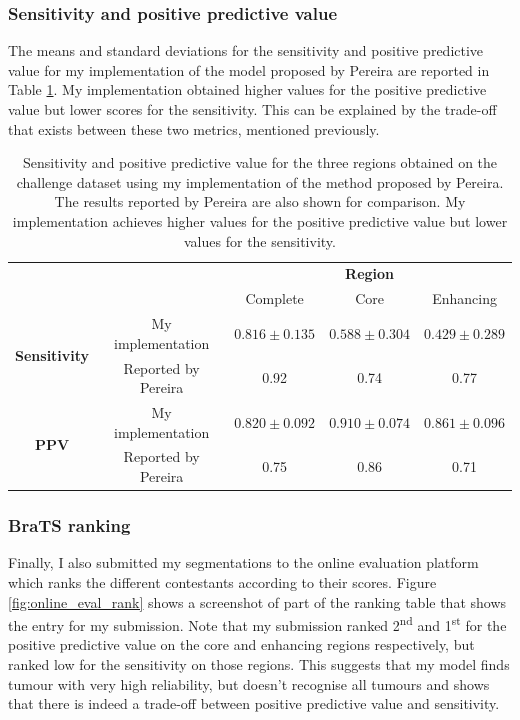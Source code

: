 \documentclass[12pt,a4paper,twoside,openright]{report}
\begin{document}
\subsubsection{Sensitivity and positive predictive value}
The means and standard deviations for the sensitivity and positive predictive value for my implementation of the model proposed by Pereira are reported in Table \ref{table:pereira_sensitivity_average}. My implementation obtained higher values for the positive predictive value but lower scores for the sensitivity. This can be explained by the trade-off that exists between these two metrics, mentioned previously.

\begin{table}
\centering	
{\def\arraystretch{1.3}\tabcolsep=5pt
\begin{tabular}{ c  c | c | c | c} 
& \multicolumn{1}{c}{} & \multicolumn{3}{c}{\textbf{Region}} \\
& & Complete & Core & Enhancing \\
\cline{2-5}
\multirow{2}{*}{\textbf{Sensitivity}} & My implementation &	 $0.816 \pm 0.135$ & $0.588 \pm 0.304$  & $0.429 \pm 0.289$ \\
& Reported by Pereira  & 0.92 & 0.74 & 0.77 \\
\cline{2-5}
\multirow{2}{*}{\textbf{PPV}} & My implementation & $0.820 \pm 0.092$ & $0.910 \pm 0.074$ & $0.861 \pm 0.096$ \\
& Reported by Pereira & 0.75 & 0.86 & 0.71 \\
\end{tabular}
}
\caption[Sensitivity and positive predictive value for the three regions obtained on the challenge dataset using my implementation of the method proposed by Pereira.]{Sensitivity and positive predictive value for the three regions obtained on the challenge dataset using my implementation of the method proposed by Pereira. The results reported by Pereira are also shown for comparison. My implementation achieves higher values for the positive predictive value but lower values for the sensitivity.}
\label{table:pereira_sensitivity_average}
\end{table}

\subsubsection{BraTS ranking}
Finally, I also submitted my segmentations to the online evaluation platform which ranks the different contestants according to their scores. Figure \ref{fig:online_eval_rank} shows a screenshot of part of the ranking table that shows the entry for my submission. Note that my submission ranked 2\textsuperscript{nd} and 1\textsuperscript{st} for the positive predictive value on the core and enhancing regions respectively, but ranked low for the sensitivity on those regions. This suggests that my model finds tumour with very high reliability, but doesn't recognise all tumours and shows that there is indeed a trade-off between positive predictive value and sensitivity.
\end{document}
